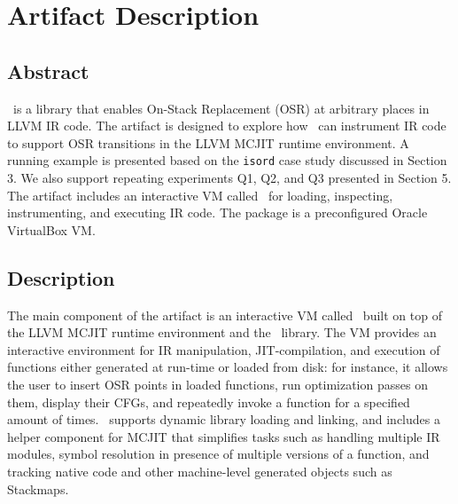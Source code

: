 
%
%



\appendix
\section{Artifact Description}


\subsection{Abstract}

\osrkit\ is a library that enables On-Stack Replacement (OSR) at arbitrary places in LLVM IR code. The artifact is designed to explore how \osrkit\ can instrument IR code to support OSR transitions in the LLVM MCJIT runtime environment. A running example is presented based on the \texttt{isord} case study discussed in Section 3. We also support repeating experiments Q1, Q2, and Q3 presented in Section 5. The artifact includes an interactive VM called \tinyvm\ for loading, inspecting, instrumenting, and executing IR code. The package is a preconfigured Oracle VirtualBox VM.


\subsection{Description}

The main component of the artifact is an interactive VM called \tinyvm\ built on top of the LLVM MCJIT runtime environment and the \osrkit\ library. The VM provides an interactive environment for IR manipulation, JIT-compilation, and execution of functions either generated at run-time or loaded from disk: for instance, it allows the user to insert OSR points in loaded functions, run optimization passes on them, display their CFGs, and repeatedly invoke a function for a specified amount of times. \tinyvm\ supports dynamic library loading and linking, and includes a helper component for MCJIT that simplifies tasks such as handling multiple IR modules, symbol resolution in presence of multiple versions of a function, and tracking native code and other machine-level generated objects such as Stackmaps.

